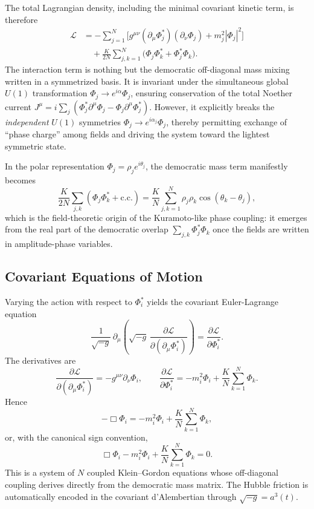 The total Lagrangian density, including the minimal covariant kinetic term, is therefore
\begin{equation}
\begin{aligned}
\mathcal{L}
&= -\sum_{j=1}^N \Big[ g^{\mu\nu}(\partial_\mu\Phi_j^*)(\partial_\nu\Phi_j) + m_j^2|\Phi_j|^2 \Big] \\
&\quad+ \frac{K}{2N}\sum_{j,k=1}^N \big(\Phi_j\Phi_k^* + \Phi_j^*\Phi_k\big) .
\end{aligned}
\end{equation}
The interaction term is nothing but the democratic off-diagonal mass mixing written in a symmetrized basis. It is invariant under the simultaneous global $U(1)$ transformation $\Phi_j\to e^{i\alpha}\Phi_j$, ensuring conservation of the total Noether current
$J^\mu = i\sum_j(\Phi_j^*\partial^\mu\Phi_j - \Phi_j\partial^\mu\Phi_j^*)$.
However, it explicitly breaks the \emph{independent} $U(1)$ symmetries $\Phi_j\to e^{i\alpha_j}\Phi_j$, thereby permitting exchange of ``phase charge'' among fields and driving the system toward the lightest symmetric state.

In the polar representation $\Phi_j=\rho_j e^{i\theta_j}$, the democratic mass term manifestly becomes
\begin{equation}
\frac{K}{2N}\sum_{j,k}(\Phi_j\Phi_k^*+\text{c.c.})
= \frac{K}{N}\sum_{j,k=1}^N \rho_j\rho_k\cos(\theta_k-\theta_j),
\end{equation}
which is the field-theoretic origin of the Kuramoto-like phase coupling: it emerges from the real part of the democratic overlap $\sum_{j,k}\Phi_j^*\Phi_k$ once the fields are written in amplitude-phase variables.

\subsection{Covariant Equations of Motion}
\label{subsec:eom}

Varying the action with respect to $\Phi_i^*$ yields the covariant Euler-Lagrange equation
\begin{equation}
\frac{1}{\sqrt{-g}}\,\partial_\mu\!\left(\sqrt{-g}\,\frac{\partial\mathcal{L}}{\partial(\partial_\mu\Phi_i^*)}\right)
= \frac{\partial\mathcal{L}}{\partial\Phi_i^*} .
\end{equation}
The derivatives are
\begin{equation}
\frac{\partial\mathcal{L}}{\partial(\partial_\mu\Phi_i^*)} = -g^{\mu\nu}\partial_\nu\Phi_i,
\qquad
\frac{\partial\mathcal{L}}{\partial\Phi_i^*}
= -m_i^2\Phi_i + \frac{K}{N}\sum_{k=1}^N\Phi_k .
\end{equation}
Hence
\begin{equation}
-\Box\Phi_i = -m_i^2\Phi_i + \frac{K}{N}\sum_{k=1}^N\Phi_k ,
\end{equation}
or, with the canonical sign convention,
\begin{equation}
\boxed{
\Box\Phi_i - m_i^2\Phi_i + \frac{K}{N}\sum_{k=1}^N\Phi_k = 0
} .
\end{equation}
This is a system of $N$ coupled Klein--Gordon equations whose off-diagonal coupling derives directly from the democratic mass matrix. The Hubble friction is automatically encoded in the covariant d'Alembertian through $\sqrt{-g}=a^3(t)$.

